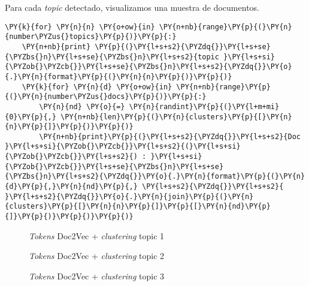     Para cada \textit{topic} detectado, visualizamos una muestra de documentos.
\vspace{0.5cm}

    \begin{tcolorbox}[breakable, size=fbox, boxrule=1pt, pad at break*=1mm,colback=cellbackground, colframe=cellborder]
\begin{Verbatim}[commandchars=\\\{\}]
\PY{k}{for} \PY{n}{n} \PY{o+ow}{in} \PY{n+nb}{range}\PY{p}{(}\PY{n}{number\PYZus{}topics}\PY{p}{)}\PY{p}{:}
    \PY{n+nb}{print} \PY{p}{(}\PY{l+s+s2}{\PYZdq{}}\PY{l+s+se}{\PYZbs{}n}\PY{l+s+se}{\PYZbs{}n}\PY{l+s+s2}{topic }\PY{l+s+si}{\PYZob{}\PYZcb{}}\PY{l+s+se}{\PYZbs{}n}\PY{l+s+s2}{\PYZdq{}}\PY{o}{.}\PY{n}{format}\PY{p}{(}\PY{n}{n}\PY{p}{)}\PY{p}{)}
    \PY{k}{for} \PY{n}{d} \PY{o+ow}{in} \PY{n+nb}{range}\PY{p}{(}\PY{n}{number\PYZus{}docs}\PY{p}{)}\PY{p}{:}
        \PY{n}{nd} \PY{o}{=} \PY{n}{randint}\PY{p}{(}\PY{l+m+mi}{0}\PY{p}{,} \PY{n+nb}{len}\PY{p}{(}\PY{n}{clusters}\PY{p}{[}\PY{n}{n}\PY{p}{]}\PY{p}{)}\PY{p}{)}
        \PY{n+nb}{print}\PY{p}{(}\PY{l+s+s2}{\PYZdq{}}\PY{l+s+s2}{Doc }\PY{l+s+si}{\PYZob{}\PYZcb{}}\PY{l+s+s2}{(}\PY{l+s+si}{\PYZob{}\PYZcb{}}\PY{l+s+s2}{) : }\PY{l+s+si}{\PYZob{}\PYZcb{}}\PY{l+s+se}{\PYZbs{}n}\PY{l+s+se}{\PYZbs{}n}\PY{l+s+s2}{\PYZdq{}}\PY{o}{.}\PY{n}{format}\PY{p}{(}\PY{n}{d}\PY{p}{,}\PY{n}{nd}\PY{p}{,} \PY{l+s+s2}{\PYZdq{}}\PY{l+s+s2}{ }\PY{l+s+s2}{\PYZdq{}}\PY{o}{.}\PY{n}{join}\PY{p}{(}\PY{n}{clusters}\PY{p}{[}\PY{n}{n}\PY{p}{]}\PY{p}{[}\PY{n}{nd}\PY{p}{]}\PY{p}{)}\PY{p}{)}\PY{p}{)}
\end{Verbatim}
\end{tcolorbox}





\begin{figure}[!ht]
	\centering
    \caption{\textit{Tokens} Doc2Vec + \textit{clustering} topic 1}
    \label{fig:birch_topic1}
\end{figure}



\begin{figure}[!ht]
	\centering
    \caption{\textit{Tokens} Doc2Vec + \textit{clustering} topic 2}
    \label{fig:birch_topic2}
\end{figure}


\begin{figure}[!ht]
	\centering
    \caption{\textit{Tokens} Doc2Vec + \textit{clustering} topic 3}
    \label{fig:birch_topic3}
\end{figure}


